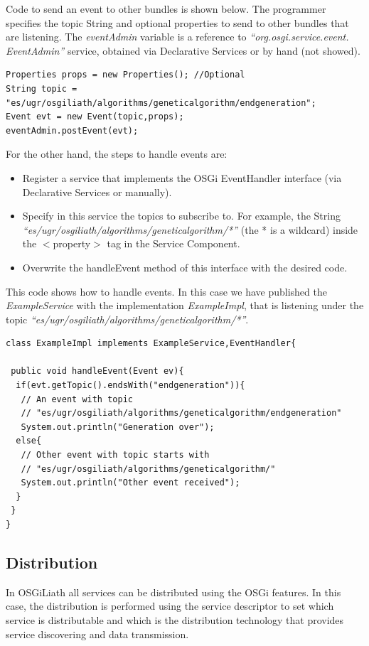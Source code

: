 \documentclass{sig-alternate}
\begin{document}
Code to send an event to other bundles is shown below. The programmer specifies the topic String and optional properties to send to other bundles that are listening. The {\em eventAdmin} variable is a reference to {\em ``org.osgi.service.event. EventAdmin''} service, obtained via Declarative Services or by hand (not showed).

\begin{lstlisting}
Properties props = new Properties(); //Optional
String topic = "es/ugr/osgiliath/algorithms/geneticalgorithm/endgeneration";
Event evt = new Event(topic,props);
eventAdmin.postEvent(evt);
\end{lstlisting}
		
For the other hand, the steps to handle events are:
\begin{itemize}
\item Register a service that implements the OSGi EventHandler interface (via Declarative Services or manually).
\item Specify in this service the topics to subscribe to. For example, the String {\em ``es/ugr/osgiliath/algorithms/geneticalgorithm/*''} (the * is a wildcard) inside the $<$property$>$ tag in the Service Component.
\item Overwrite the handleEvent method of this interface with the desired code.
\end{itemize}

This code shows how to handle events. In this case we have published the {\em ExampleService} with the implementation {\em ExampleImpl}, that is listening under the topic {\em ``es/ugr/osgiliath/algorithms/geneticalgorithm/*''}.

\begin{lstlisting}
class ExampleImpl implements ExampleService,EventHandler{

 public void handleEvent(Event ev){
  if(evt.getTopic().endsWith("endgeneration")){
   // An event with topic 
   // "es/ugr/osgiliath/algorithms/geneticalgorithm/endgeneration"
   System.out.println("Generation over");
  else{
   // Other event with topic starts with
   // "es/ugr/osgiliath/algorithms/geneticalgorithm/"
   System.out.println("Other event received");
  }
 }
}
\end{lstlisting}


\subsection{Distribution}
In OSGiLiath all services can be distributed using the OSGi features. In this case, the distribution is performed using the service descriptor to set which service is distributable and which is the distribution technology that provides service discovering and data transmission.
\end{document}
